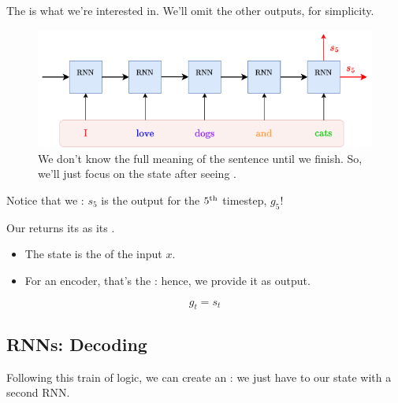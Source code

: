         The  is what we're interested in. We'll omit the other outputs, for simplicity.

        \begin{figure}[H]
            \centering
            \includegraphics[width=0.7\linewidth]{images/transformers_images/rnn_encoder_outputless.png}
            \caption*{We don't know the full meaning of the sentence until we finish. So, we'll just focus on the state after seeing .}
        \end{figure}

        Notice that we : $s_5$ is the output for the $5^{ \text{th} }$ timestep, $g_5$!\\

        \begin{definition}
            Our  returns its  as its .

            \begin{itemize}
                \item The state is the  of the input $x$.

                \item For an encoder, that's the : hence, we provide it as output.
            \end{itemize}

            \begin{equation*}
                g_t = s_t
            \end{equation*}
        \end{definition}



    \phantom{}

    \subsection{RNNs: Decoding}

        Following this train of logic, we can create an : we just have to  our state with a second RNN.

